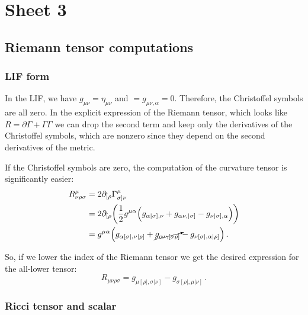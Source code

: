 \documentclass[main.tex]{subfiles}
\begin{document}
\section{Sheet 3}

\subsection{Riemann tensor computations}

\subsubsection{LIF form}

In the LIF, we have \(g_{\mu \nu } = \eta_{\mu \nu }\) and \(= g_{\mu \nu , \alpha }=0\). Therefore, the Christoffel symbols are all zero. 
In the explicit expression of the Riemann tensor, which looks like \(R = \partial \Gamma  + \Gamma \Gamma\) we can drop the second term and keep only the derivatives of the Christoffel symbols, which are nonzero since they depend on the second derivatives of the metric.

If the Christoffel symbols are zero, the computation of the curvature tensor is significantly easier: 
%
\begin{subequations}
\begin{align}
  R^{\mu }_{\nu \rho \sigma }
  &=  2 \partial_{[\rho }\Gamma^{\mu }_{\sigma ] \nu}  \\
  &= 2 \partial_{[\rho } \qty(\frac{1}{2} g^{\mu \alpha } \qty(g_{\alpha |\sigma ], \nu } + g_{\alpha \nu  , |\sigma  ]} - g_{\nu  |\sigma], \alpha }))  \\
  &= g^{\mu \alpha }\qty(g_{\alpha [\sigma |, \nu | \rho      ]} + \cancelto{}{g_{\alpha \nu, [\sigma \rho]}}-g_{\nu [\sigma |, \alpha | \rho  ]})
\,.
\end{align}
\end{subequations}


So, if we lower the index of the Riemann tensor we get the desired expression for the all-lower tensor: 
%
\begin{equation}
  R_{\mu \nu \rho \sigma} = g_{\mu [\rho|, \sigma | \nu ]} - g_{\sigma [\rho|, \mu | \nu ]} 
\,.
\end{equation}

\subsubsection{Ricci tensor and scalar}
\end{document}
